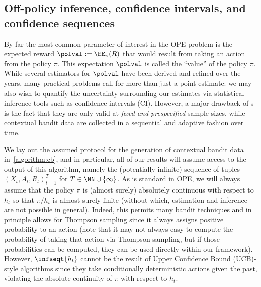 
\subsection{Off-policy inference, confidence intervals, and confidence sequences}
By far the most common parameter of interest in the OPE problem is the expected reward $\polval := \EE_{\pi}(R)$ that would result from taking an action from the policy $\pi$. This expectation $\polval$ is called the ``value'' of the policy $\pi$. While several estimators for $\polval$ have been derived and refined over the years, many practical problems call for more than just a point estimate: we may also wish to quantify the uncertainty surrounding our estimates via statistical inference tools such as confidence intervals (CI). However, a major drawback of \ci{}s is the fact that they are only valid at \emph{fixed and prespecified} sample sizes, while contextual bandit data are collected in a sequential and adaptive fashion over time.

We lay out the assumed protocol for the generation of contextual bandit data in~\cref{algorithm:cb}, and in particular, all of our results will assume access to the output of this algorithm, namely the (potentially infinite) sequence of tuples $(X_t, A_t, R_t)_{t=1}^T$ for $T \in \NN \cup \{ \infty\}$.
As is standard in OPE, we will always assume that the policy $\pi$ is (almost surely) absolutely continuous with respect to $h_t$ so that $\pi / h_t$ is almost surely finite (without which, estimation and inference are not possible in general). Indeed, this permits many bandit techniques and in principle allows for Thompson sampling since it always assigns positive probability to an action (note that it may not always easy to compute the probability of taking that action via Thompson sampling, but if those probabilities can be computed, they can be used directly within our framework). However, $\infseqt{h_t}$ cannot be the result of Upper Confidence Bound (UCB)-style algorithms since they take conditionally deterministic actions given the past, violating the absolute continuity of $\pi$ with respect to $h_t$.

